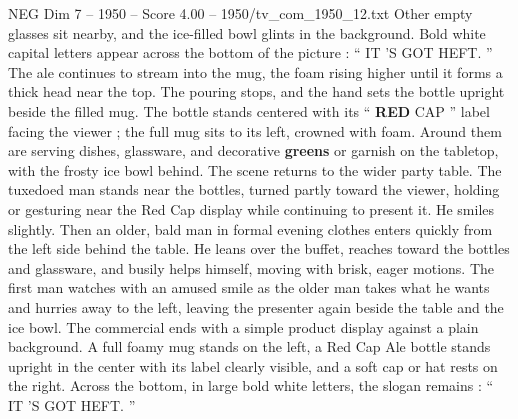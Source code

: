 \begin{textsample}{NEG Dim 7 – 1950 – Score 4.00 – 1950/tv\_com\_1950\_12.txt}
Other empty glasses sit nearby, and the ice-filled bowl glints in the background.
Bold white capital letters appear across the bottom of the picture : “ IT ’S GOT HEFT. ” The ale continues to stream into the mug, the foam rising higher until it forms a thick head near the top.
The pouring stops, and the hand sets the bottle upright beside the filled mug.
The bottle stands centered with its “ \textbf{RED} CAP ” label facing the viewer ; the full mug sits to its left, crowned with foam.
Around them are serving dishes, glassware, and decorative \textbf{greens} or garnish on the tabletop, with the frosty ice bowl behind.
The scene returns to the wider party table.
The tuxedoed man stands near the bottles, turned partly toward the viewer, holding or gesturing near the Red Cap display while continuing to present it.
He smiles slightly.
Then an older, bald man in formal evening clothes enters quickly from the left side behind the table.
He leans over the buffet, reaches toward the bottles and glassware, and busily helps himself, moving with brisk, eager motions.
The first man watches with an amused smile as the older man takes what he wants and hurries away to the left, leaving the presenter again beside the table and the ice bowl.
The commercial ends with a simple product display against a plain background.
A full foamy mug stands on the left, a Red Cap Ale bottle stands upright in the center with its label clearly visible, and a soft cap or hat rests on the right.
Across the bottom, in large bold white letters, the slogan remains : “ IT ’S GOT HEFT. ”

\end{textsample}

